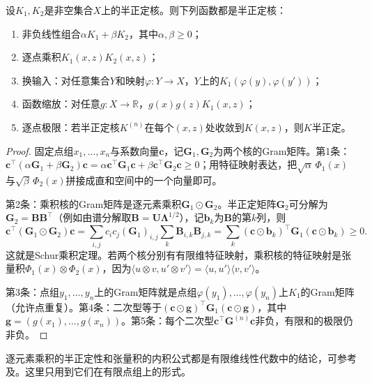 \begin{theorem}[核的运算]
\label{thm:rkhs-kernel-operations}
设$K_1,K_2$是非空集合$X$上的半正定核。则下列函数都是半正定核：
\begin{enumerate}
\item 非负线性组合$\alpha K_1+\beta K_2$，其中$\alpha,\beta\ge0$；
\item 逐点乘积$K_1(x,z)K_2(x,z)$；
\item 换输入：对任意集合$Y$和映射$\varphi:Y\to X$，$Y$上的$K_1(\varphi(y),\varphi(y'))$；
\item 函数缩放：对任意$g:X\to\mathbb R$，$g(x)g(z)K_1(x,z)$；
\item 逐点极限：若半正定核$K^{(n)}$在每个$(x,z)$处收敛到$K(x,z)$，则$K$半正定。
\end{enumerate}
\end{theorem}

\begin{proof}
固定点组$x_1,\ldots,x_n$与系数向量$\bm c$，记$\bm G_1,\bm G_2$为两个核的Gram矩阵。第1条：$\bm c^{\top}(\alpha\bm G_1+\beta\bm G_2)\bm c=\alpha\bm c^{\top}\bm G_1\bm c+\beta\bm c^{\top}\bm G_2\bm c\ge0$；用特征映射表达，把$\sqrt\alpha\,\Phi_1(x)$与$\sqrt\beta\,\Phi_2(x)$拼接成直和空间中的一个向量即可。

第2条：乘积核的Gram矩阵是逐元素乘积$\bm G_1\odot\bm G_2$。半正定矩阵$\bm G_2$可分解为$\bm G_2=\bm B\bm B^{\top}$（例如由谱分解取$\bm B=\bm U\bm\Lambda^{1/2}$），记$\bm b_k$为$\bm B$的第$k$列，则
\[
\bm c^{\top}(\bm G_1\odot\bm G_2)\bm c
=\sum_{i,j}c_ic_j(\bm G_1)_{i,j}\sum_k\bm B_{i,k}\bm B_{j,k}
=\sum_k(\bm c\odot\bm b_k)^{\top}\bm G_1(\bm c\odot\bm b_k)\ge0 .
\]
这就是Schur乘积定理。若两个核分别有有限维特征映射，乘积核的特征映射是张量积$\Phi_1(x)\otimes\Phi_2(x)$，因为$\langle u\otimes v,u'\otimes v'\rangle=\langle u,u'\rangle\langle v,v'\rangle$。

第3条：点组$y_1,\ldots,y_n$上的Gram矩阵就是点组$\varphi(y_1),\ldots,\varphi(y_n)$上$K_1$的Gram矩阵（允许点重复）。第4条：二次型等于$(\bm c\odot\bm g)^{\top}\bm G_1(\bm c\odot\bm g)$，其中$\bm g=(g(x_1),\ldots,g(x_n))$。第5条：每个二次型$\bm c^{\top}\bm G^{(n)}\bm c$非负，有限和的极限仍非负。
\end{proof}

逐元素乘积的半正定性和张量积的内积公式都是有限维线性代数中的结论，可参考及。这里只用到它们在有限点组上的形式。

